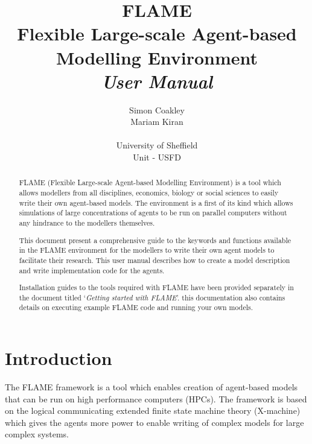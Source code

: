 \documentclass[12pt,a4paper]{article}
\begin{document}
\title{\textbf{FLAME}
\\Flexible Large-scale Agent-based Modelling Environment\\
 \emph{User Manual}}
\author{Simon Coakley\\Mariam Kiran
\\
\\ University of Sheffield
\\ Unit - USFD}

\maketitle

\pagebreak

\begin{abstract}

FLAME (Flexible Large-scale Agent-based Modelling Environment) is a
tool which allows modellers from all disciplines, economics, biology
or social sciences to easily write their own agent-based models. The
environment is a first of its kind which allows simulations of large
concentrations of agents to be run on parallel computers without any
hindrance to the modellers themselves.

This document present a comprehensive guide to the keywords and
functions available in the FLAME environment for the modellers to
write their own agent models to facilitate their research. This user
manual describes how to create a model description and write
implementation code for the agents.

Installation guides to the tools required with FLAME have been
provided separately in the document titled `\emph{Getting started
with FLAME}'. this documentation also contains details on executing
example FLAME code and running your own models.

\end{abstract}

\pagebreak
\tableofcontents
\pagebreak

\section{Introduction}

The FLAME framework is a tool which enables creation of agent-based models
that can be run on high performance computers (HPCs). The framework
is based on the logical communicating extended finite state
machine theory (X-machine) which gives the agents more power to
enable writing of complex models for large complex systems.
\end{document}
